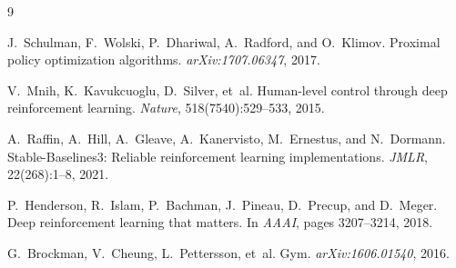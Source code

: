 \documentclass[10pt, a4paper, twocolumn]{article}
\begin{document}

\begin{thebibliography}{9}

J.~Schulman, F.~Wolski, P.~Dhariwal, A.~Radford, and O.~Klimov.
\newblock Proximal policy optimization algorithms.
\newblock \textit{arXiv:1707.06347}, 2017.

V.~Mnih, K.~Kavukcuoglu, D.~Silver, et~al.
\newblock Human-level control through deep reinforcement learning.
\newblock \textit{Nature}, 518(7540):529--533, 2015.

A.~Raffin, A.~Hill, A.~Gleave, A.~Kanervisto, M.~Ernestus, and N.~Dormann.
\newblock Stable-{B}aselines3: Reliable reinforcement learning implementations.
\newblock \textit{JMLR}, 22(268):1--8, 2021.

P.~Henderson, R.~Islam, P.~Bachman, J.~Pineau, D.~Precup, and D.~Meger.
\newblock Deep reinforcement learning that matters.
\newblock In \textit{AAAI}, pages 3207--3214, 2018.

G.~Brockman, V.~Cheung, L.~Pettersson, et~al.
 {Gym}.
\newblock \textit{arXiv:1606.01540}, 2016.

\end{thebibliography}
\end{document}
